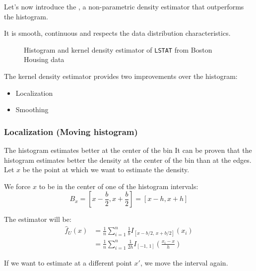 Let's now introduce the , a non-parametric
density estimator that outperforms the histogram.

It is smooth, continuous and respects the data distribution characteristics.

\begin{figure}[H]
	\caption{Histogram and kernel density estimator of \texttt{LSTAT} from Boston Housing data}%
\end{figure}

The kernel density estimator provides two improvements over the histogram:
\begin{itemize}
	\item Localization
	\item Smoothing
\end{itemize}

\subsubsection{Localization (Moving histogram)}
\begin{prop}{The histogram estimates better at the center of the bin}{}
	It can be proven that the histogram estimates better the density at the center of the
	bin than at the edges.
	\tcblower
	Let $x$ be the point at which we want to estimate the density.

	We force $x$ to be in the center of one of the histogram intervals:
	\begin{equation*}
		B_x = \left[ x - \frac{b}{2}, x + \frac{b}{2} \right] = [ x - h, x + h ]
	\end{equation*}

	The estimator will be:
	\begin{align*}
		\widehat{f}_U(x) & = \frac{1}{n}\sum_{i=1}^n \frac{1}{b} I_{[x - b/2,\, x + b/2]}(x_i)                  \\
		                 & = \frac{1}{n}\sum_{i=1}^n \frac{1}{2h} I_{[-1,\, 1]}\left( \frac{x_i - x}{h} \right)
	\end{align*}

	If we want to estimate at a different point $x'$, we move the interval again.
\end{prop}

